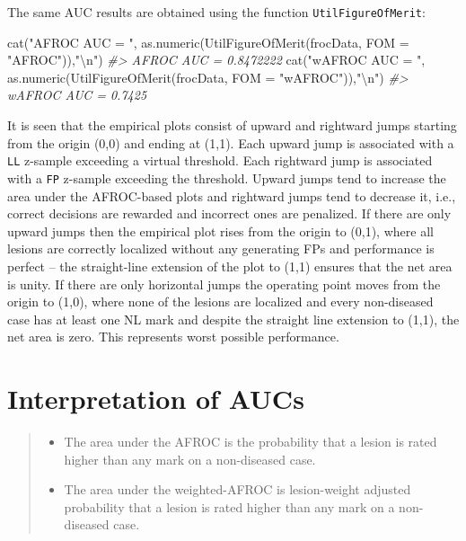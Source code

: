 \documentclass[
]{book}
\newenvironment{Shaded}{\begin{snugshade}}{\end{snugshade}}
\newcommand{\AttributeTok}[1]{\textcolor[rgb]{0.77,0.63,0.00}{#1}}
\newcommand{\CommentTok}[1]{\textcolor[rgb]{0.56,0.35,0.01}{\textit{#1}}}
\newcommand{\FunctionTok}[1]{\textcolor[rgb]{0.00,0.00,0.00}{#1}}
\newcommand{\NormalTok}[1]{#1}
\newcommand{\SpecialCharTok}[1]{\textcolor[rgb]{0.00,0.00,0.00}{#1}}
\newcommand{\StringTok}[1]{\textcolor[rgb]{0.31,0.60,0.02}{#1}}
\providecommand{\tightlist}{%
  \setlength{\itemsep}{0pt}\setlength{\parskip}{0pt}}
\begin{document}
The same AUC results are obtained using the function \texttt{UtilFigureOfMerit}:

\begin{Shaded}
\begin{Highlighting}[]
\FunctionTok{cat}\NormalTok{(}\StringTok{"AFROC AUC = "}\NormalTok{, }
    \FunctionTok{as.numeric}\NormalTok{(}\FunctionTok{UtilFigureOfMerit}\NormalTok{(frocData, }\AttributeTok{FOM =} \StringTok{"AFROC"}\NormalTok{)),}\StringTok{"}\SpecialCharTok{\textbackslash{}n}\StringTok{"}\NormalTok{)}
\CommentTok{\#\textgreater{} AFROC AUC =  0.8472222}
\FunctionTok{cat}\NormalTok{(}\StringTok{"wAFROC AUC = "}\NormalTok{, }
    \FunctionTok{as.numeric}\NormalTok{(}\FunctionTok{UtilFigureOfMerit}\NormalTok{(frocData, }\AttributeTok{FOM =} \StringTok{"wAFROC"}\NormalTok{)),}\StringTok{"}\SpecialCharTok{\textbackslash{}n}\StringTok{"}\NormalTok{)}
\CommentTok{\#\textgreater{} wAFROC AUC =  0.7425}
\end{Highlighting}
\end{Shaded}

It is seen that the empirical plots consist of upward and rightward jumps starting from the origin (0,0) and ending at (1,1). Each upward jump is associated with a \texttt{LL} z-sample exceeding a virtual threshold. Each rightward jump is associated with a \texttt{FP} z-sample exceeding the threshold. Upward jumps tend to increase the area under the AFROC-based plots and rightward jumps tend to decrease it, i.e., correct decisions are rewarded and incorrect ones are penalized. If there are only upward jumps then the empirical plot rises from the origin to (0,1), where all lesions are correctly localized without any generating FPs and performance is perfect -- the straight-line extension of the plot to (1,1) ensures that the net area is unity. If there are only horizontal jumps the operating point moves from the origin to (1,0), where none of the lesions are localized and every non-diseased case has at least one NL mark and despite the straight line extension to (1,1), the net area is zero. This represents worst possible performance.

\hypertarget{empirical-meanings}{%
\section{Interpretation of AUCs}\label{empirical-meanings}}

\begin{quote}
\begin{itemize}
\tightlist
\item
  The area under the AFROC is the probability that a lesion is rated higher than any mark on a non-diseased case.
\item
  The area under the weighted-AFROC is lesion-weight adjusted probability that a lesion is rated higher than any mark on a non-diseased case.
\end{itemize}
\end{quote}
\end{document}
